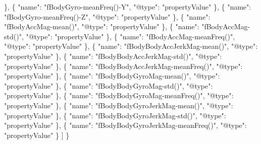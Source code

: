 \documentclass[
]{article}
\newenvironment{Shaded}{\begin{snugshade}}{\end{snugshade}}
\newcommand{\DataTypeTok}[1]{\textcolor[rgb]{0.13,0.29,0.53}{#1}}
\newcommand{\ErrorTok}[1]{\textcolor[rgb]{0.64,0.00,0.00}{\textbf{#1}}}
\newcommand{\FunctionTok}[1]{\textcolor[rgb]{0.00,0.00,0.00}{#1}}
\newcommand{\OtherTok}[1]{\textcolor[rgb]{0.56,0.35,0.01}{#1}}
\newcommand{\StringTok}[1]{\textcolor[rgb]{0.31,0.60,0.02}{#1}}
\begin{document}
\begin{Shaded}
\begin{Highlighting}[]
    \FunctionTok{\}}\OtherTok{,}
    \FunctionTok{\{}
      \DataTypeTok{"name"}\FunctionTok{:} \StringTok{"fBodyGyro{-}meanFreq(){-}Y"}\FunctionTok{,}
      \DataTypeTok{"@type"}\FunctionTok{:} \StringTok{"propertyValue"}
    \FunctionTok{\}}\OtherTok{,}
    \FunctionTok{\{}
      \DataTypeTok{"name"}\FunctionTok{:} \StringTok{"fBodyGyro{-}meanFreq(){-}Z"}\FunctionTok{,}
      \DataTypeTok{"@type"}\FunctionTok{:} \StringTok{"propertyValue"}
    \FunctionTok{\}}\OtherTok{,}
    \FunctionTok{\{}
      \DataTypeTok{"name"}\FunctionTok{:} \StringTok{"fBodyAccMag{-}mean()"}\FunctionTok{,}
      \DataTypeTok{"@type"}\FunctionTok{:} \StringTok{"propertyValue"}
    \FunctionTok{\}}\OtherTok{,}
    \FunctionTok{\{}
      \DataTypeTok{"name"}\FunctionTok{:} \StringTok{"fBodyAccMag{-}std()"}\FunctionTok{,}
      \DataTypeTok{"@type"}\FunctionTok{:} \StringTok{"propertyValue"}
    \FunctionTok{\}}\OtherTok{,}
    \FunctionTok{\{}
      \DataTypeTok{"name"}\FunctionTok{:} \StringTok{"fBodyAccMag{-}meanFreq()"}\FunctionTok{,}
      \DataTypeTok{"@type"}\FunctionTok{:} \StringTok{"propertyValue"}
    \FunctionTok{\}}\OtherTok{,}
    \FunctionTok{\{}
      \DataTypeTok{"name"}\FunctionTok{:} \StringTok{"fBodyBodyAccJerkMag{-}mean()"}\FunctionTok{,}
      \DataTypeTok{"@type"}\FunctionTok{:} \StringTok{"propertyValue"}
    \FunctionTok{\}}\OtherTok{,}
    \FunctionTok{\{}
      \DataTypeTok{"name"}\FunctionTok{:} \StringTok{"fBodyBodyAccJerkMag{-}std()"}\FunctionTok{,}
      \DataTypeTok{"@type"}\FunctionTok{:} \StringTok{"propertyValue"}
    \FunctionTok{\}}\OtherTok{,}
    \FunctionTok{\{}
      \DataTypeTok{"name"}\FunctionTok{:} \StringTok{"fBodyBodyAccJerkMag{-}meanFreq()"}\FunctionTok{,}
      \DataTypeTok{"@type"}\FunctionTok{:} \StringTok{"propertyValue"}
    \FunctionTok{\}}\OtherTok{,}
    \FunctionTok{\{}
      \DataTypeTok{"name"}\FunctionTok{:} \StringTok{"fBodyBodyGyroMag{-}mean()"}\FunctionTok{,}
      \DataTypeTok{"@type"}\FunctionTok{:} \StringTok{"propertyValue"}
    \FunctionTok{\}}\OtherTok{,}
    \FunctionTok{\{}
      \DataTypeTok{"name"}\FunctionTok{:} \StringTok{"fBodyBodyGyroMag{-}std()"}\FunctionTok{,}
      \DataTypeTok{"@type"}\FunctionTok{:} \StringTok{"propertyValue"}
    \FunctionTok{\}}\OtherTok{,}
    \FunctionTok{\{}
      \DataTypeTok{"name"}\FunctionTok{:} \StringTok{"fBodyBodyGyroMag{-}meanFreq()"}\FunctionTok{,}
      \DataTypeTok{"@type"}\FunctionTok{:} \StringTok{"propertyValue"}
    \FunctionTok{\}}\OtherTok{,}
    \FunctionTok{\{}
      \DataTypeTok{"name"}\FunctionTok{:} \StringTok{"fBodyBodyGyroJerkMag{-}mean()"}\FunctionTok{,}
      \DataTypeTok{"@type"}\FunctionTok{:} \StringTok{"propertyValue"}
    \FunctionTok{\}}\OtherTok{,}
    \FunctionTok{\{}
      \DataTypeTok{"name"}\FunctionTok{:} \StringTok{"fBodyBodyGyroJerkMag{-}std()"}\FunctionTok{,}
      \DataTypeTok{"@type"}\FunctionTok{:} \StringTok{"propertyValue"}
    \FunctionTok{\}}\OtherTok{,}
    \FunctionTok{\{}
      \DataTypeTok{"name"}\FunctionTok{:} \StringTok{"fBodyBodyGyroJerkMag{-}meanFreq()"}\FunctionTok{,}
      \DataTypeTok{"@type"}\FunctionTok{:} \StringTok{"propertyValue"}
    \FunctionTok{\}}
  \OtherTok{]}
\FunctionTok{\}}\ErrorTok{\textasciigrave{}}
\end{Highlighting}
\end{Shaded}
\end{document}
